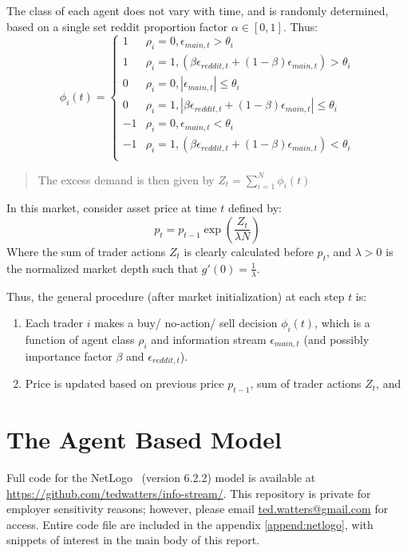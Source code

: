 \documentclass[a4paper, 11pt]{report}
\let\Oldsection\section
\renewcommand{\section}{\FloatBarrier\Oldsection}
\begin{document}
The class of each agent does not vary with time, and is randomly determined, based on a single set reddit proportion factor $\alpha \in [0,1]$. Thus:
\begin{equation}\label{trading_decision}
\phi_{i}(t) = \begin{cases}
	1 & \rho_{i}=0,\epsilon_{main,t}>\theta_{i} \\
	1 & \rho_{i}=1,(\beta \epsilon_{reddit,t} + (1-\beta)\epsilon_{main,t}) > \theta_{i}\\
	0 & \rho_{i}=0, |\epsilon_{main,t}| \leq \theta_{i} \\
	0 & \rho_{i}=1, |\beta \epsilon_{reddit,t} + (1-\beta)\epsilon_{main,t}| \leq \theta_{i} \\
	-1 & \rho_{i}=0,\epsilon_{main,t}<\theta_{i} \\
	-1 & \rho_{i}=1,(\beta \epsilon_{reddit,t} + (1-\beta)\epsilon_{main,t}) < \theta_{i}\\
\end{cases}
\end{equation}
\begin{quote}
	The excess demand is then given by $Z_{t} = \sum_{i=1}^{N} \phi_{i}(t)$
\end{quote}
In this market, consider asset price at time $t$ defined by:
\begin{equation}\label{price_equation}
	p_{t} = p_{t-1} \exp \left( \frac{ Z_{t}}{\lambda N}\right)
\end{equation}
Where the sum of trader actions $Z_{t}$ is clearly calculated before $p_{t}$, and $\lambda > 0$ is the normalized market depth such that $g'(0) = \frac{1}{\lambda}$. 

Thus, the general procedure (after market initialization) at each step $t$ is:
\begin{enumerate}
	\item Each trader $i$ makes a buy/ no-action/ sell decision $\phi_{i}(t)$, which is a function of agent class $\rho_{i}$ and information stream $\epsilon_{main,t}$ (and possibly importance factor $\beta$ and $\epsilon_{reddit,t}$).
	\item Price is updated based on previous price $p_{t-1}$, sum of trader actions $Z_{t}$, and 
\end{enumerate}
\section{The Agent Based Model}\label{agent_based_model}
	Full code for the NetLogo~\cite{netlogo} (version 6.2.2) model is available at \url{https://github.com/tedwatters/info-stream/}. This repository is private for employer sensitivity reasons; however, please email \url{ted.watters@gmail.com} for access. Entire code file are included in the appendix \autoref{append:netlogo}, with snippets of interest in the main body of this report.
	
\end{document}
